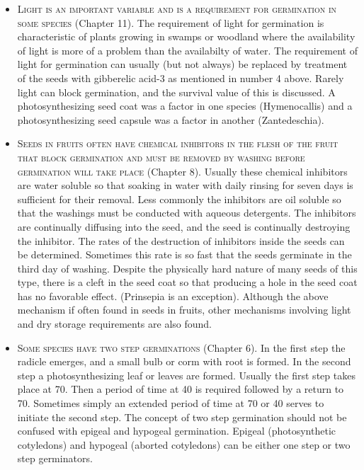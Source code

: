 \begin{itemize}
\item \textsc{Light is an important variable and is a requirement
for germination in some species} (Chapter 11). The requirement of light
for germination is characteristic of plants growing in swamps or woodland where the
availability of light is more of a problem than the availabilty of water. The requirement
of light for germination can usually (but not always) be replaced by treatment of the
seeds with gibberelic acid-3 as mentioned in number 4 above. Rarely light can block
germination, and the survival value of this is discussed. A photosynthesizing seed
coat was a factor in one species (Hymenocallis) and a photosynthesizing seed
capsule was a factor in another (Zantedeschia).

\item \textsc{Seeds in fruits often have chemical inhibitors in
the flesh of the fruit that block germination and must be
removed by washing before germination will take place}
(Chapter 8). Usually these chemical inhibitors are water soluble so that soaking in
water with daily rinsing for seven days is sufficient for their removal. Less commonly
the inhibitors are oil soluble so that the washings must be conducted with aqueous
detergents. The inhibitors are continually diffusing into the seed, and the seed is
continually destroying the inhibitor. The rates of the destruction of inhibitors inside the
seeds can be determined. Sometimes this rate is so fast that the seeds germinate in
the third day of washing. Despite the physically hard nature of many seeds of this
type, there is a cleft in the seed coat so that producing a hole in the seed coat has no
favorable effect. (Prinsepia is an exception). Although the above mechanism if often
found in seeds in fruits, other mechanisms involving light and dry storage
requirements are also found.

\item \textsc{Some species have two step germinations} (Chapter 6).
In the first step the radicle emerges, and a small bulb or corm with root is formed. In
the second step a photosynthesizing leaf or leaves are formed. Usually the first step
takes place at 70. Then a period of time at 40 is required followed by a return to 70.
Sometimes simply an extended period of time at 70 or 40 serves to initiate the second
step. The concept of two step germination should not be confused with epigeal and
hypogeal germination. Epigeal (photosynthetic cotyledons) and hypogeal (aborted
cotyledons) can be either one step or two step germinators.


\end{itemize}
